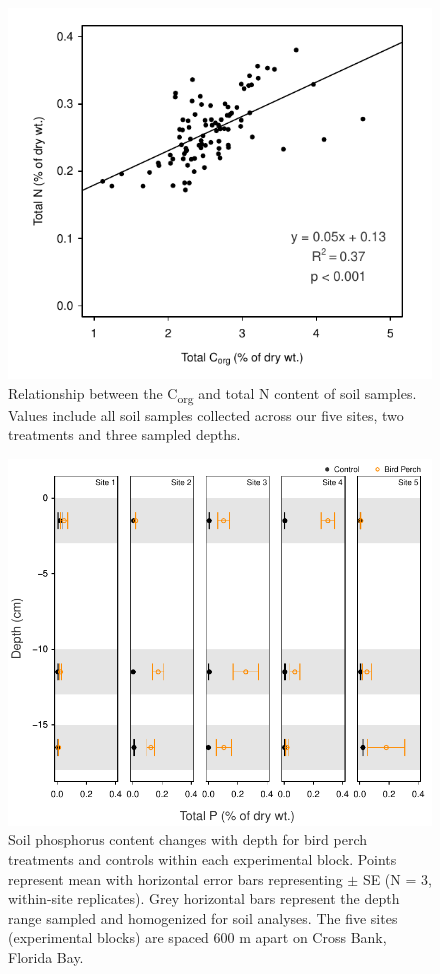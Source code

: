 \begin{figure}
  \centering
  \includegraphics[width=.95\textwidth]{Figures/chapter1/fig4}
\caption[Relationship between the C\textsubscript{org} and total N content of soil samples]{Relationship between the C\textsubscript{org} and total N content of soil samples. Values include all soil samples collected across our five sites, two treatments and three sampled depths.}
  \label{fig:1fig4}
\end{figure}

\begin{figure}
  \centering
  \includegraphics[width=.9\textwidth]{Figures/chapter1/fig5}
\caption[Soil phosphorus content changes with depth]{Soil phosphorus content changes with depth for bird perch treatments and controls within each experimental block. Points represent mean with horizontal error bars representing $\pm$ SE (N = 3, within-site replicates). Grey horizontal bars represent the depth range sampled and homogenized for soil analyses. The five sites (experimental blocks) are spaced 600 m apart on Cross Bank, Florida Bay.}
  \label{fig:1fig5}
\end{figure}

